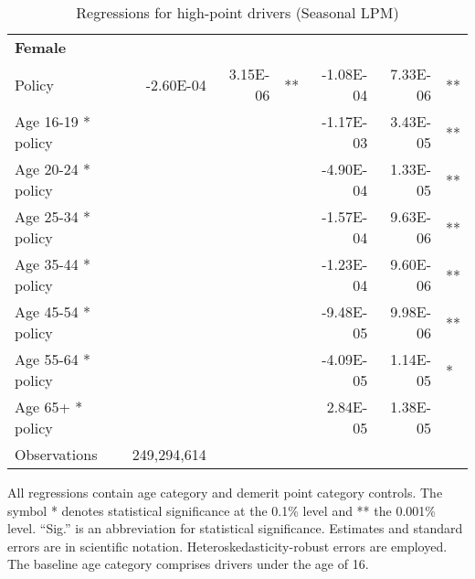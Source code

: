 \begin{table}
\begin{tabular}{l r r l r r l}
\hline 

\textbf{Female} \\ 

Policy             &  -2.60E-04        &  3.15E-06       &   **       &  -1.08E-04        &  7.33E-06       &   **       \\ 
Age 16-19 * policy           & & &  &  -1.17E-03        &  3.43E-05       &   **       \\ 
Age 20-24 * policy           & & &  &  -4.90E-04        &  1.33E-05       &   **       \\ 
Age 25-34 * policy           & & &  &  -1.57E-04        &  9.63E-06       &   **       \\ 
Age 35-44 * policy           & & &  &  -1.23E-04        &  9.60E-06       &   **       \\ 
Age 45-54 * policy           & & &  &  -9.48E-05        &  9.98E-06       &   **       \\ 
Age 55-64 * policy           & & &  &  -4.09E-05        &  1.14E-05       &    *       \\ 
Age 65+ * policy           & & &  &  2.84E-05        &  1.38E-05       &            \\ 
Observations & 249,294,614 \\ 


\hline 

\end{tabular} 
\caption{Regressions for high-point drivers (Seasonal LPM)} 
All regressions contain age category and demerit point category controls. 
The symbol * denotes statistical significance at the 0.1\% level 
and ** the 0.001\% level. 
``Sig.'' is an abbreviation for statistical significance. 
Estimates and standard errors are in scientific notation. 
Heteroskedasticity-robust errors are employed. 
The baseline age category comprises drivers under the age of 16. 
\label{tab:seas_high_pt_regs} 
\end{table} 
 
